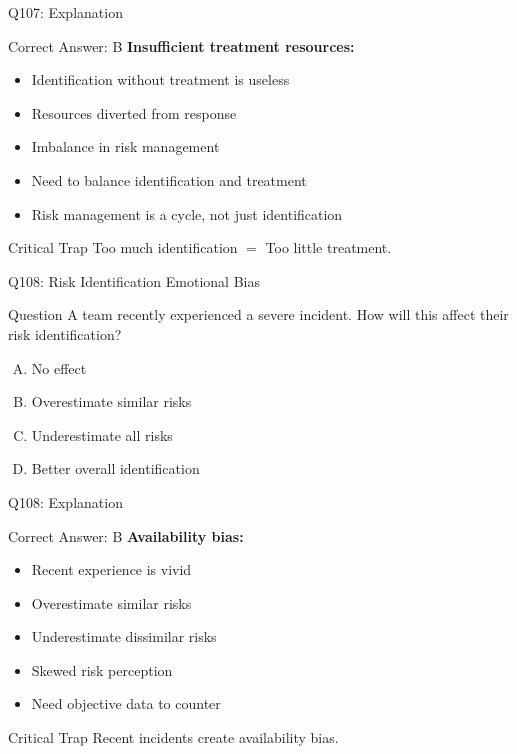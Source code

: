 \documentclass{beamer}
\begin{document}
	\begin{frame}{Q107: Explanation}
		\begin{block}{Correct Answer: B}
			\textbf{Insufficient treatment resources:}
			\begin{itemize}
				\item Identification without treatment is useless
				\item Resources diverted from response
				\item Imbalance in risk management
				\item Need to balance identification and treatment
				\item Risk management is a cycle, not just identification
			\end{itemize}
		\end{block}
		\begin{alertblock}{Critical Trap}
			Too much identification $=$ Too little treatment.
		\end{alertblock}
	\end{frame}
	
	\begin{frame}{Q108: Risk Identification Emotional Bias}
		\begin{block}{Question}
			A team recently experienced a severe incident. How will this affect their risk identification?
		\end{block}
		\begin{enumerate}[(A)]
			\item No effect
			\item Overestimate similar risks
			\item Underestimate all risks
			\item Better overall identification
		\end{enumerate}
	\end{frame}
	
	\begin{frame}{Q108: Explanation}
		\begin{block}{Correct Answer: B}
			\textbf{Availability bias:}
			\begin{itemize}
				\item Recent experience is vivid
				\item Overestimate similar risks
				\item Underestimate dissimilar risks
				\item Skewed risk perception
				\item Need objective data to counter
			\end{itemize}
		\end{block}
		\begin{alertblock}{Critical Trap}
			Recent incidents create availability bias.
		\end{alertblock}
	\end{frame}
	
\end{document}
